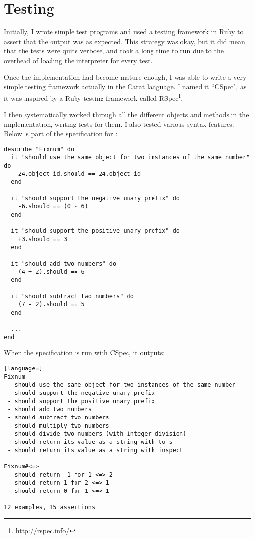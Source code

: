 \chapter{Testing}

Initially, I wrote simple test programs and used a testing framework in Ruby to assert that the output was as expected. This strategy was okay, but it did mean that the tests were quite verbose, and took a long time to run due to the overhead of loading the interpreter for every test.

Once the implementation had become mature enough, I was able to write a very simple testing framework actually in the Carat language. I named it ``CSpec", as it was inspired by a Ruby testing framework called RSpec\footnote{\url{http://rspec.info/}}.

I then systematically worked through all the different objects and methods in the implementation, writing tests for them. I also tested various syntax features. Below is part of the specification for :

\begin{lstlisting}
describe "Fixnum" do
  it "should use the same object for two instances of the same number" do
    24.object_id.should == 24.object_id
  end
  
  it "should support the negative unary prefix" do
    -6.should == (0 - 6)
  end
  
  it "should support the positive unary prefix" do
    +3.should == 3
  end
  
  it "should add two numbers" do
    (4 + 2).should == 6
  end
  
  it "should subtract two numbers" do
    (7 - 2).should == 5
  end
  
  ...
end
\end{lstlisting}

\newpage
When the  specification is run with CSpec, it outputs:

\begin{minipage}{\textwidth}
\begin{lstlisting}[language=]
Fixnum
 - should use the same object for two instances of the same number
 - should support the negative unary prefix
 - should support the positive unary prefix
 - should add two numbers
 - should subtract two numbers
 - should multiply two numbers
 - should divide two numbers (with integer division)
 - should return its value as a string with to_s
 - should return its value as a string with inspect

Fixnum#<=>
 - should return -1 for 1 <=> 2
 - should return 1 for 2 <=> 1
 - should return 0 for 1 <=> 1

12 examples, 15 assertions
\end{lstlisting}
\end{minipage}

